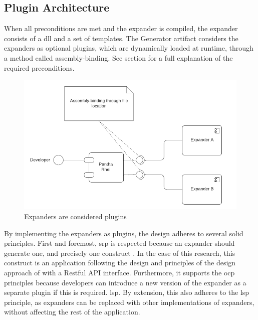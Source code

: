 \subsection{Plugin Architecture} \label{subsec_plugin_architecture}

When all preconditions are met and the expander is compiled, the expander consists of a
\gls{dll} and a set of templates. The Generator artifact considers the expanders as
optional plugins, which are dynamically loaded at runtime, through a method called
assembly-binding. See section  for a full explanation of the
required preconditions.

\begin{figure}[H]
  \centering
  \includegraphics[width=1\textwidth]{Figures/plugin_architecture.pdf}
  \caption[Plugin Archticture]{Expanders are considered plugins}
  \label{fi:plugin_architecture}
\end{figure}

By implementing the expanders as plugins, the design adheres to several \gls{solid}
principles. First and foremost, \gls{srp} is respected because an expander should generate
one, and precisely one construct \parencite[403]{mannaert_normalized_2016}. In the case of
this research, this construct is an application following the design and principles of the
design approach of \ca with a Restful API interface. Furthermore, it supports the
\gls{ocp} principles because developers can introduce a new version of the expander as a
separate plugin if this is required. \gls{lsp}. By extension, this also adheres to the
\gls{lsp} principle, as expanders can be replaced with other implementations of expanders,
without affecting the rest of the application.